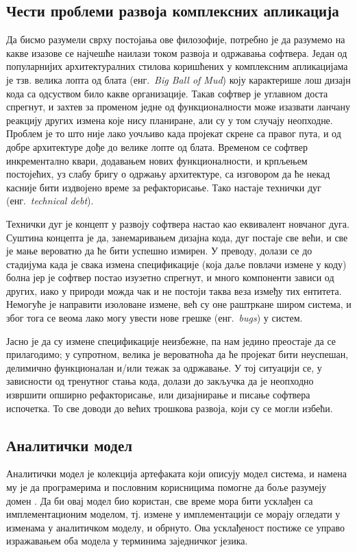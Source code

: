 \documentclass[12pt,oneside]{memoir}
\begin{document}
\subsection{Чести проблеми развоја комплексних апликација}
Да бисмо разумели сврху постојања ове филозофије, потребно је да разумемо на какве изазове се најчешће наилази током развоја и одржавања софтвера. Један од популарнијих архитектуралних стилова коришћених у комплексним апликацијама је тзв. велика лопта од блата (енг.~\textit{Big Ball of Mud}) коју карактерише лош дизајн кода са одсуством било какве организације. Такав софтвер је углавном доста спрегнут, и захтев за променом једне од функционалности може изазвати ланчану реакцију других измена које нису планиране, али су у том случају неопходне. Проблем је то што није лако уочљиво када пројекат скрене са правог пута, и од добре архитектуре дође до велике лопте од блата. Временом се софтвер инкрементално квари, додавањем нових функционалности, и крпљењем постојећих, уз слабу бригу о одржању архитектуре, са изговором да ће некад касније бити издвојено време за рефакторисање. Тако настаје технички дуг (енг.~\textit{technical debt}).

Технички дуг је концепт у развоју софтвера настао као еквивалент новчаног дуга. Суштина концепта је да, занемаривањем дизајна кода, дуг постаје све већи, и све је мање вероватно да ће бити успешно измирен. У преводу, долази се до стадијума када је свака измена спецификације (која даље повлачи измене у коду) болна јер је софтвер постао изузетно спрегнут, и много компоненти зависи од других, иако у природи можда чак и не постоји таква веза између тих ентитета. Немогуће је направити изоловане измене, већ су оне раштркане широм система, и због тога се веома лако могу увести нове грешке (енг.~\textit{bugs}) у систем.

Јасно је да су измене спецификације неизбежне, па нам једино преостаје да се прилагодимо; у супротном, велика је вероватноћа да ће пројекат бити неуспешан, делимично функционалан и/или тежак за одржавање. У тој ситуацији се, у зависности од тренутног стања кода, долази до закључка да је неопходно извршити опширно рефакторисање, или дизајнирање и писање софтвера испочетка. То све доводи до већих трошкова развоја, који су се могли избећи.

\subsection{Аналитички модел}
Аналитички модел је колекција артефаката који описују модел система, и намена му је да програмерима и пословним корисницима помогне да боље разумеју домен \cite{DomainDrivenDessign}. Да би овај модел био користан, све време мора бити усклађен са имплементационим моделом, тј. измене у имплементацији се морају огледати у изменама у аналитичком моделу, и обрнуто. Ова усклађеност постиже се управо изражавањем оба модела у терминима заједничког језика.
\end{document}
